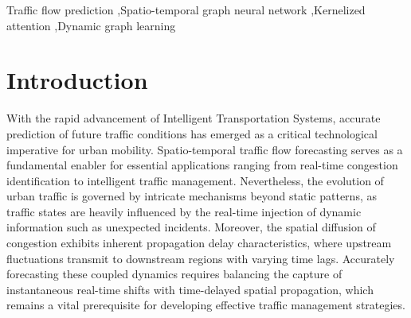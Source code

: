 \documentclass[5p,times,authoryear]{elsarticle}
\begin{document}
\begin{frontmatter}

\address[First]{Transportation College, Jilin University, Changchun 130022, China}

\address[Second]{College of Communication Engineering, Jilin University, Changchun 130012, China}

\address[Third]{Jilin Traffic Planning and Design Institute, Changchun 130021, China}





\begin{abstract}

\end{abstract}


\begin{keyword}
Traffic flow prediction \sep Spatio-temporal graph neural network \sep Kernelized attention \sep Dynamic graph learning
\end{keyword}

\end{frontmatter}




\section{Introduction}
With the rapid advancement of Intelligent Transportation Systems, accurate prediction of future traffic conditions has emerged as a critical technological imperative for urban mobility. Spatio-temporal traffic flow forecasting serves as a fundamental enabler for essential applications ranging from real-time congestion identification to intelligent traffic management. Nevertheless, the evolution of urban traffic is governed by intricate mechanisms beyond static patterns, as traffic states are heavily influenced by the real-time injection of dynamic information such as unexpected incidents. Moreover, the spatial diffusion of congestion exhibits inherent propagation delay characteristics, where upstream fluctuations transmit to downstream regions with varying time lags. Accurately forecasting these coupled dynamics requires balancing the capture of instantaneous real-time shifts with time-delayed spatial propagation, which remains a vital prerequisite for developing effective traffic management strategies.
\end{document}
